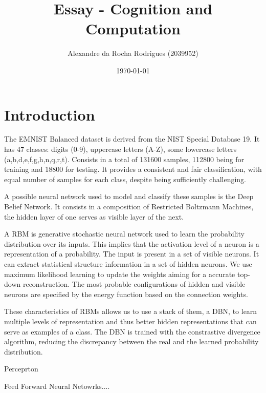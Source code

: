 \documentclass[a4paper, 11pt]{article}
\begin{document}
	
	\title{Essay - Cognition and Computation }
	\author{{\small Alexandre da Rocha Rodrigues (2039952)}}
	\date{\today}
	\maketitle
	
	\section{Introduction}
	
		The EMNIST \cite{emnist} Balanced dataset is derived from the NIST Special Database 19.
		It has 47 classes: digits (0-9), uppercase letters (A-Z), some lowercase letters (a,b,d,e,f,g,h,n,q,r,t).
		Consists in a total of 131600 samples, 112800 being for training and 18800 for testing.
		It provides a consistent and fair classification, with equal number of samples for each class, despite being sufficiently challenging. 
		
		A possible neural network used to model and classify these samples is the Deep Belief Network.
		It consists in a composition of Restricted Boltzmann Machines, the hidden layer of one serves as visible layer of the next.
		
		A RBM is generative stochastic neural network used to learn the probability distribution over its inputs.
		This implies that the activation level of a neuron is a representation of a probability.
		The input is present in a set of visible neurons.
		It can extract statistical structure information in a set of hidden neurons.
		We use maximum likelihood learning to update the weights aiming for a accurate top-down reconstruction.
		The most probable configurations of hidden and visible neurons are specified by the energy function based on the connection weights.
		
		These characteristics of RBMs allows us to use a stack of them, a DBN, to learn multiple levels of representation and thus better hidden representations that can serve as examples of a class.
		The DBN is trained with the constrastive divergence algorithm, reducing the discrepancy between the real and the learned probability distribution.
		
		Perceprton	
		
		Feed Forward Neural Netowrks....
		
	
\end{document}
